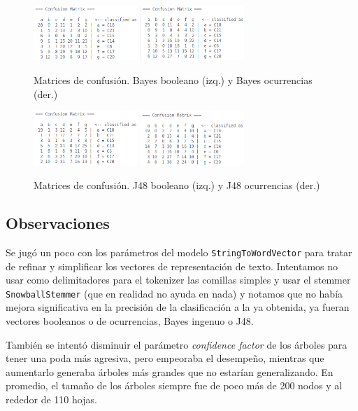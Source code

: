 \documentclass[spanish,11pt,letterpaper]{article}
\begin{document}
\begin{figure}[h]
\centering
\includegraphics[width=0.35\textwidth]{bayes_spop_boolean}
\includegraphics[width=0.35\textwidth]{bayes_spop_counter}
\caption{Matrices de confusión. Bayes booleano (izq.) y Bayes ocurrencias (der.)}
\end{figure}
\begin{figure}[h]
\centering
\includegraphics[width=0.35\textwidth]{j48_spop_boolean}
\includegraphics[width=0.35\textwidth]{j48_spop_counter}
\caption{Matrices de confusión. J48 booleano (izq.) y J48 ocurrencias (der.)}
\end{figure}

\subsection{Observaciones}

Se jugó un poco con los parámetros del modelo \texttt{StringToWordVector} para tratar
de refinar y simplificar los vectores de representación de texto. Intentamos no usar
como delimitadores para el tokenizer las comillas simples y usar el stemmer
\texttt{SnowballStemmer} (que en realidad no ayuda en nada) y notamos que no había
mejora significativa en la precisión de la clasificación a la ya obtenida, ya fueran
vectores booleanos o de ocurrencias, Bayes ingenuo o J48.

También se intentó disminuir el parámetro \textit{confidence factor} de los árboles
para tener una poda más agresiva, pero empeoraba el desempeño, mientras que
aumentarlo generaba árboles más grandes que no estarían generalizando. En promedio,
el tamaño de los árboles siempre fue de poco más de 200 nodos y al rededor de 110 hojas.
\end{document}
